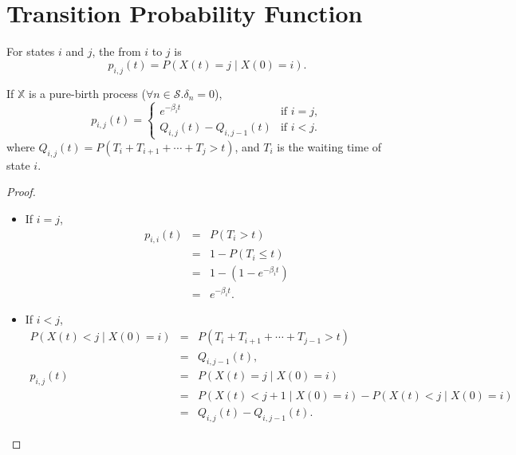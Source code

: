 \section{Transition Probability Function}

\begin{definition}
For states $ i $ and $ j $, the  from $ i $ to $ j $ is
\[ p_{i, j}(t) = P(X(t) = j \mid X(0) = i). \]
\end{definition}

\begin{lemma}
If $ \mathbb{X} $ is a pure-birth process ($ \forall n \in \mathcal{S}. \delta_{n} = 0 $),
\[ p_{i, j}(t) = \begin{cases}
e^{-\beta_{i}t}               & \text{if } i = j, \\
Q_{i, j}(t) - Q_{i, j - 1}(t) & \text{if } i < j.
\end{cases} \]
where $ Q_{i, j}(t) = P(T_{i} + T_{i + 1} + \cdots + T_{j} > t) $, and $ T_{i} $ is the waiting time of state $ i $.
\begin{proof}
\begin{itemize}
\item If $ i = j $,
\begin{eqnarray*}
p_{i, i}(t)
  & = & P(T_{i} > t) \\
  & = & 1 - P(T_{i} \le t) \\
  & = & 1 - (1 - e^{-\beta_{i}t}) \\
  & = & e^{-\beta_{i}t}.
\end{eqnarray*}

\item If $ i < j $,
\begin{eqnarray*}
P(X(t) < j \mid X(0) = i)
  & = & P(T_{i} + T_{i + 1} + \cdots + T_{j - 1} > t) \\
  & = & Q_{i, j - 1}(t), \\
p_{i, j}(t)
  & = & P(X(t) = j \mid X(0) = i) \\
  & = & P(X(t) < j + 1 \mid X(0) = i) - P(X(t) < j \mid X(0) = i) \\
  & = & Q_{i, j}(t) - Q_{i, j - 1}(t).
\end{eqnarray*}
\end{itemize}
\end{proof}
\end{lemma}

